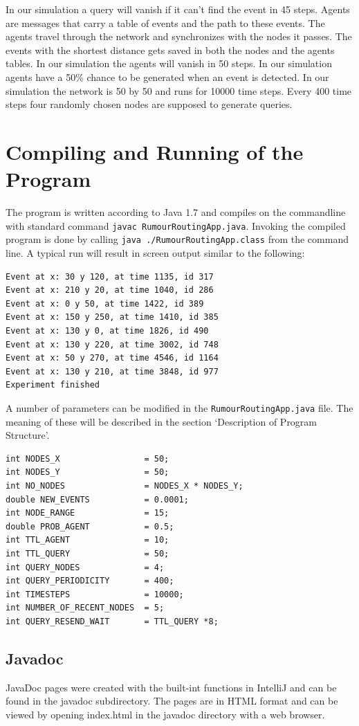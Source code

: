 \documentclass[a4paper,11pt,twoside]{article}
\begin{document}
In our simulation a query will vanish if it can't find the event in 45
steps. Agents are messages that carry a table of events and the path
to these events. The agents travel through the network and
synchronizes with the nodes it passes. The events with the shortest
distance gets saved in both the nodes and the agents tables. In our
simulation the agents will vanish in 50 steps. In our simulation
agents have a 50\% chance to be generated when an event is
detected. In our simulation the network is 50 by 50 and runs for
10000 time steps. Every 400 time steps four randomly chosen nodes are
supposed to generate queries.

\section{Compiling and Running of the Program}

The program is written according to Java 1.7 and compiles on the
commandline with standard command \texttt{javac RumourRoutingApp.java}.
Invoking the compiled program is done by calling \texttt{java
  ./RumourRoutingApp.class} from the command line.
A typical run will result in screen output similar to the following:
\begin{verbatim}
Event at x: 30 y 120, at time 1135, id 317
Event at x: 210 y 20, at time 1040, id 286
Event at x: 0 y 50, at time 1422, id 389
Event at x: 150 y 250, at time 1410, id 385
Event at x: 130 y 0, at time 1826, id 490
Event at x: 130 y 220, at time 3002, id 748
Event at x: 50 y 270, at time 4546, id 1164
Event at x: 130 y 210, at time 3848, id 977
Experiment finished
\end{verbatim}

A number of parameters can be modified in the
\texttt{RumourRoutingApp.java} file. The meaning of these will be
described in the section `Description of Program Structure'.
\begin{verbatim}
int NODES_X                 = 50;
int NODES_Y                 = 50;
int NO_NODES                = NODES_X * NODES_Y;
double NEW_EVENTS           = 0.0001;
int NODE_RANGE              = 15;
double PROB_AGENT           = 0.5;
int TTL_AGENT               = 10;
int TTL_QUERY               = 50;
int QUERY_NODES             = 4;
int QUERY_PERIODICITY       = 400;
int TIMESTEPS               = 10000;
int NUMBER_OF_RECENT_NODES  = 5;
int QUERY_RESEND_WAIT       = TTL_QUERY *8;
\end{verbatim}



\subsection{Javadoc}
JavaDoc pages were created with the built-int functions in IntelliJ
and can be found in the javadoc subdirectory. The pages are in HTML
format and can be viewed by opening index.html in the javadoc
directory with a web browser.
\end{document}
